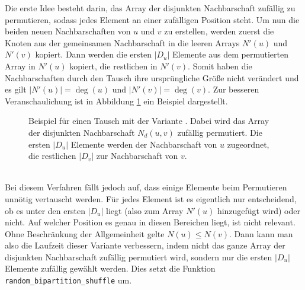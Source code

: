 Die erste Idee besteht darin,  
das Array der disjunkten Nachbarschaft zufällig zu permutieren, sodass jedes Element an 
einer zufälligen Position steht. Um nun die beiden \glqq neuen\grqq{} Nachbarschaften von $u$ und $v$ zu erstellen,
werden zuerst die Knoten aus der gemeinsamen Nachbarschaft in die leeren Arrays $N'(u)$ und $N'(v)$ kopiert.
Dann werden die ersten $|D_{u}|$ Elemente aus dem permutierten Array in $N'(u)$ kopiert, die restlichen
in $N'(v)$. Somit haben die Nachbarschaften durch den Tausch ihre 
ursprüngliche Größe nicht verändert und es gilt $|N'(u)| = \deg(u)$ und
$|N'(v)| = \deg(v)$.
Zur besseren Veranschaulichung ist in Abbildung \ref{fig:trade_shuffle} ein Beispiel dargestellt.
%
%
\begin{figure}
\centering
  \caption[Beispiel eines Tausches der disjunkten Nachbarschaft mit der Variante Permutation]{Beispiel für einen Tausch mit der Variante \perm. Dabei wird das Array der 
  disjunkten Nachbarschaft $N_{d}(u,v)$ zufällig permutiert. Die ersten $|D_{u}|$ Elemente werden der Nachbarschaft
  von $u$ zugeordnet, die restlichen $|D_{v}|$ zur Nachbarschaft von $v$. }
  \label{fig:trade_shuffle}
\end{figure}
%
%
%
\\

Bei diesem Verfahren fällt  jedoch auf, dass einige Elemente beim Permutieren unnötig vertauscht werden.
Für jedes Element ist es eigentlich nur entscheidend, ob es unter den ersten $|D_{u}|$  liegt (also zum Array
$N'(u)$ hinzugefügt wird) oder nicht. Auf welcher Position es genau in 
diesen Bereichen liegt, ist nicht relevant. Ohne Beschränkung der Allgemeinheit gelte 
$N(u) \le N(v)$. Dann kann man
also die Laufzeit dieser Variante verbessern, indem nicht das ganze Array der disjunkten Nachbarschaft zufällig permutiert 
wird, sondern nur die ersten $|D_{u}|$ Elemente zufällig gewählt werden.
 Dies setzt die Funktion 
\texttt{random\_bipartition\_shuffle} um.
\\

